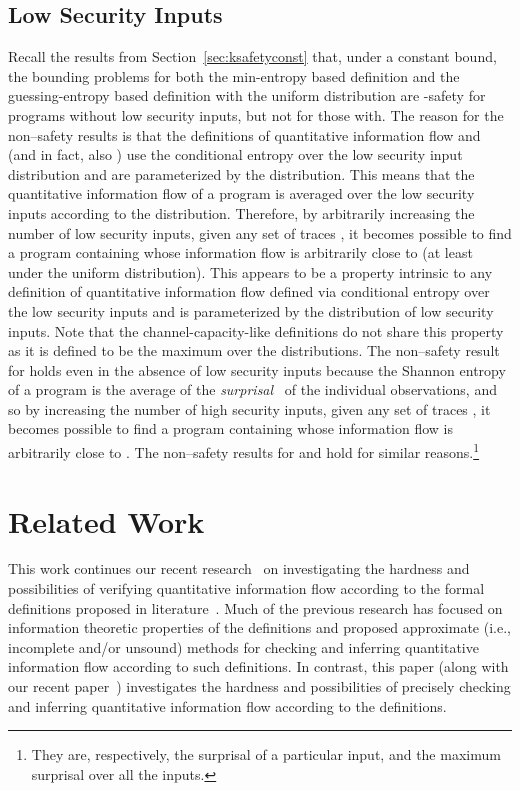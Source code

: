 \documentclass{llncs}
\begin{document}
\subsection{Low Security Inputs}

\label{sec:lowsecinputs}

Recall the results from Section~\ref{sec:ksafetyconst} that, under a
constant bound, the bounding problems for both the min-entropy based
definition and the guessing-entropy based definition with the uniform
distribution are -safety for programs without low security inputs,
but not for those with.  The reason for the non--safety results is
that the definitions of quantitative information flow  and
 (and in fact, also ) use the conditional entropy
over the low security input distribution and are parameterized by the
distribution.  This means that the quantitative information flow of a
program is averaged over the low security inputs according to the
distribution.  Therefore, by arbitrarily increasing the number of low
security inputs, given any set of traces , it becomes possible to
find a program containing  whose information flow is arbitrarily
close to  (at least under the uniform distribution).  This appears
to be a property intrinsic to any definition of quantitative
information flow defined via conditional entropy over the low security
inputs and is parameterized by the distribution of low security
inputs.  Note that the channel-capacity-like definitions do not share
this property as it is defined to be the maximum over the
distributions.  The non--safety result for  holds
even in the absence of low security inputs because the Shannon entropy
of a program is the average of the {\em
  surprisal}~\cite{clarkson:csf2005} of the individual observations,
and so by increasing the number of high security inputs, given any set
of traces , it becomes possible to find a program containing 
whose information flow is arbitrarily close to .  The
non--safety results for  and  hold for similar reasons.\footnote{They are, respectively,
  the surprisal of a particular input, and the maximum surprisal over
  all the inputs.}

\section{Related Work}

\label{sec:related}

This work continues our recent
research~\cite{DBLP:conf/csfw/yasuoka2010} on investigating the
hardness and possibilities of verifying quantitative information flow
according to the formal definitions proposed in
literature~\cite{clarkson:csf2005,denning82,clarkjcs2007,malacaria:popl2007,smith09,kopf07,DBLP:conf/sp/BackesKR09,mccamant:pldi2008,malacaria08,NMS2009,Braun:09:MFPS,DBLP:conf/csfw/KopfS10}.
Much of the previous research has focused on information theoretic
properties of the definitions and proposed approximate (i.e.,
incomplete and/or unsound) methods for checking and inferring
quantitative information flow according to such definitions.  In
contrast, this paper (along with our recent
paper~\cite{DBLP:conf/csfw/yasuoka2010}) investigates the hardness and
possibilities of precisely checking and inferring quantitative
information flow according to the definitions.
\end{document}
